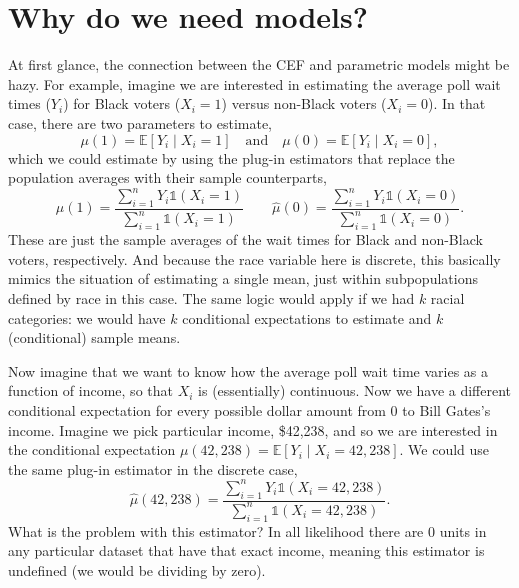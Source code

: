 \documentclass[
  letterpaper,
  DIV=11,
  numbers=noendperiod]{scrreprt}
\newcommand{\E}{\mathbb{E}}
\theoremstyle{definition}
\theoremstyle{plain}
\theoremstyle{definition}
\theoremstyle{remark}
\begin{document}
\hypertarget{why-do-we-need-models}{%
\section{Why do we need models?}\label{why-do-we-need-models}}

At first glance, the connection between the CEF and parametric models
might be hazy. For example, imagine we are interested in estimating the
average poll wait times (\(Y_i\)) for Black voters (\(X_i = 1\)) versus
non-Black voters (\(X_i=0\)). In that case, there are two parameters to
estimate, \[
\mu(1) = \E[Y_i \mid X_i = 1] \quad \text{and}\quad \mu(0) = \E[Y_i \mid X_i = 0],
\] which we could estimate by using the plug-in estimators that replace
the population averages with their sample counterparts, \[ 
\widehat{\mu}(1) = \frac{\sum_{i=1}^{n} Y_{i}\mathbb{1}(X_{i} = 1)}{\sum_{i=1}^{n}\mathbb{1}(X_{i} = 1)} \qquad \widehat{\mu}(0) = \frac{\sum_{i=1}^{n} Y_{i}\mathbb{1}(X_{i} = 0)}{\sum_{i=1}^{n}\mathbb{1}(X_{i} = 0)}.
\] These are just the sample averages of the wait times for Black and
non-Black voters, respectively. And because the race variable here is
discrete, this basically mimics the situation of estimating a single
mean, just within subpopulations defined by race in this case. The same
logic would apply if we had \(k\) racial categories: we would have \(k\)
conditional expectations to estimate and \(k\) (conditional) sample
means.

Now imagine that we want to know how the average poll wait time varies
as a function of income, so that \(X_i\) is (essentially) continuous.
Now we have a different conditional expectation for every possible
dollar amount from 0 to Bill Gates's income. Imagine we pick particular
income, \$42,238, and so we are interested in the conditional
expectation \(\mu(42,238)= \E[Y_{i}\mid X_{i} = 42,238]\). We could use
the same plug-in estimator in the discrete case, \[
\widehat{\mu}(42,238) = \frac{\sum_{i=1}^{n} Y_{i}\mathbb{1}(X_{i} = 42,238)}{\sum_{i=1}^{n}\mathbb{1}(X_{i} = 42,238)}.
\] What is the problem with this estimator? In all likelihood there are
0 units in any particular dataset that have that exact income, meaning
this estimator is undefined (we would be dividing by zero).
\end{document}
